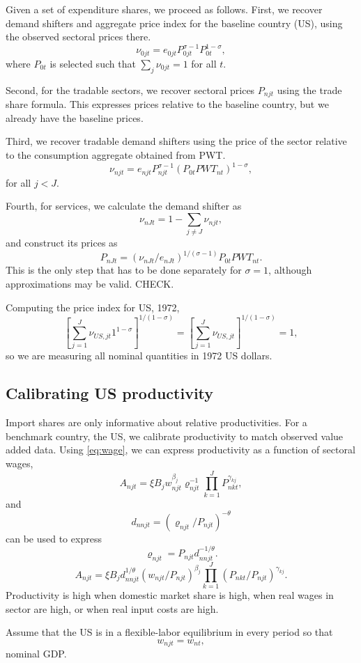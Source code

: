 \documentclass[12pt]{article}
\begin{document}
Given a set of expenditure shares, we proceed as follows. First, we recover demand shifters and aggregate price index for the baseline country (US), using the observed sectoral prices there.
\[
\nu_{0jt} = e_{0jt} P_{0jt}^{\sigma-1} P_{0t}^{1-\sigma},
\]
where $P_{0t}$ is selected such that $\sum_j \nu_{0jt}=1$ for all $t$.

Second, for the tradable sectors, we recover sectoral prices $P_{njt}$ using the trade share formula. This expresses prices relative to the baseline country, but we already have the baseline prices.

Third, we recover tradable demand shifters using the price of the sector relative to the consumption aggregate obtained from PWT.
\[
\nu_{njt} = e_{njt} P_{njt}^{\sigma-1} (P_{0t}PWT_{nt})^{1-\sigma},
\]
for all $j<J$.

Fourth, for services, we calculate the demand shifter as 
\[
\nu_{nJt} = 1-\sum_{j\neq J}\nu_{njt},
\]
and construct its prices as
\[
P_{nJt} = (\nu_{nJt}/e_{nJt})^{1/(\sigma-1)} P_{0t}PWT_{nt}.
\]
This is the only step that has to be done separately for $\sigma=1$, although approximations may be valid. CHECK.

Computing the price index for US, 1972,
\begin{equation}
	\left[\sum_{j=1}^J \nu_{US,jt} 1^{1-\sigma}\right]^{1/(1-\sigma)} = 
	\left[\sum_{j=1}^J \nu_{US,jt}\right]^{1/(1-\sigma)}
 =1,
\end{equation}
so we are measuring all nominal quantities in 1972 US dollars.

\subsection{Calibrating US productivity}
Import shares are only informative about relative productivities. For a benchmark country, the US, we calibrate productivity to match observed value added data. Using \eqref{eq:wage}, we can express productivity as a function of sectoral wages,
\begin{equation*}\label{eq:value_added}
A_{njt} =
	\xi B_j
	w_{njt}^{\beta_j}
	\varrho_{njt}^{-1}  	
	\prod_{k=1}^J P_{nkt}^{\gamma_{kj}},
\end{equation*}
and
\[
d_{nnjt} = (\varrho_{njt}/P_{njt})^{-\theta}
\]
can be used to express
\[
\varrho_{njt} = P_{njt} d_{nnjt}^{-1/\theta}.
\]
\begin{equation}\label{eq:productivity}
A_{njt} =
	\xi B_j
	d_{nnjt}^{1/\theta}
	(w_{njt}/P_{njt})^{\beta_j}
 	\prod_{k=1}^J (P_{nkt}/P_{njt})^{\gamma_{kj}}.
\end{equation}
Productivity is high when domestic market share is high, when real wages in sector are high, or when real input costs are high.

Assume that the US is in a flexible-labor equilibrium in every period so that 
\[
w_{njt} = w_{nt},
\]
nominal GDP. 
\end{document}
